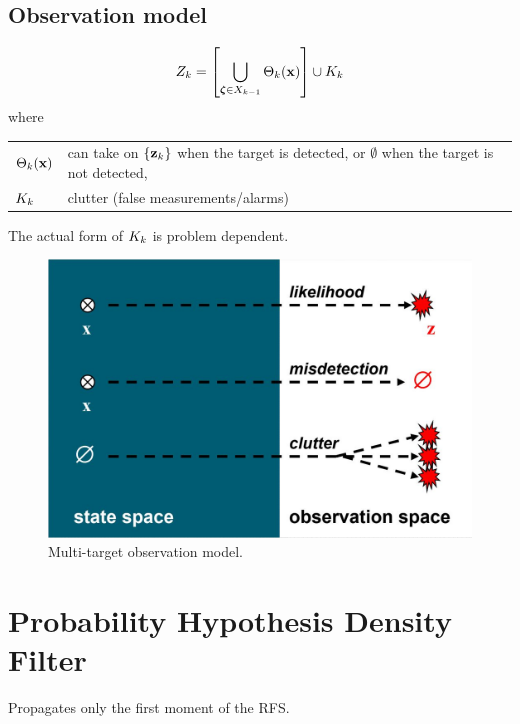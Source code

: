 \documentclass[a4paper,10pt]{scrreprt}
\theoremstyle{theorem}
\theoremstyle{definition}
\begin{document}
\subsection{Observation model}
\begin{equation}\label{eq:multitarget_observation}
	\msRFS_\tind = \bqty{ \bigcup_{\vb{\zeta} \in \stRFS_{\tind-1}} \Theta_{\tind}(\inVar) } \cup K_\tind
\end{equation}
where
\begin{table}[h]
	\centering
	\begin{tabular}{@{} l l @{}}
		\toprule
		\( \Theta_{\tind}(\inVar) \)	& can take on \( \Bqty{\msVar_\tind} \) when the target is detected, or \( \emptyset \) when the target is not detected, \\
		\( K_k \)					& clutter (false measurements/alarms) \\
		\bottomrule
	\end{tabular}
\end{table}
The actual form of \( K_k \) is problem dependent.
\begin{figure}[h]
	\centering
	\includegraphics[scale=0.22]{./img/multi-target_observation_model}
	\caption{Multi-target observation model.}
\end{figure}




\section{Probability Hypothesis Density Filter}
Propagates only the first moment of the RFS.
\end{document}
